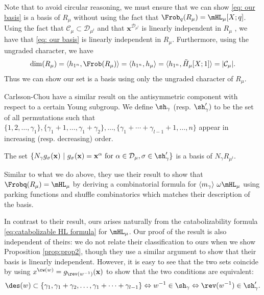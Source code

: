 \begin{rema}
    Note that to avoid circular reasoning, we must ensure that we can show \eqref{eq: our basis} is a basis of $R_\mu$ without using the fact that $\Frob_q(R_\mu) =\mHL_\mu[X;q]$. Using the fact that $\mathcal{C}_\mu\subset \mathcal{D}_{\mu^t}$ and that $\mathbf{x}^{\mathcal{D}_{\mu^t}}$ is linearly independent in $R_\mu$ \cite[Corollary 3.14]{CC}, we have that \eqref{eq: our basis} is linearly independent in $R_\mu$. Furthermore, using the ungraded character, we have
    \[\dim(R_\mu) = \langle h_{1^n}, \Frob(R_\mu)\rangle = \langle h_{1^n}, h_\mu \rangle = \langle h_{1^n}, \tilde{H}_\mu[X;1] \rangle =|\mathcal{C}_\mu|. \]
    Thus we can show our set is a basis using only the ungraded character of $R_\mu$.
\end{rema}

Carlsson-Chou \cite{CC} have a similar result on the antisymmetric component with respect to a certain Young subgroup. 
We define $\sh_\gamma$ (resp. $\sh'_\gamma)$ to be the set of all permutations such that $\{1,2,\dots, \gamma_1\}, \{\gamma_1+1,\dots, \gamma_1+\gamma_2\}, \dots, \{\gamma_1+\cdots + \gamma_{l-1} + 1, \dots, n\}$ appear in increasing (resp. decreasing) order.

\begin{thm}
    The set $\{N_\gamma g_\sigma(\mathbf{x}) \ | \  g_\sigma(\mathbf{x}) = \mathbf{x}^\alpha \text{ for }\alpha\in \mathcal{D}_\mu, \sigma \in \sh'_{\gamma}\}$ is a basis of $N_\gamma R_{\mu^t}$.
\end{thm}
Similar to what we do above, they use their result to show that $\Frobq(R_{\mu}) = \mHL_{\mu}$ by deriving a combinatorial formula for $\langle m_\gamma\rangle  \  \omega \mHL_{\mu}$ using parking functions and shuffle combinatorics which matches their description of the basis.

In contrast to their result, ours arises naturally from the catabolizability formula \eqref{eq:catabolizable HL formula} for $\mHL_{\mu}$. 
Our proof of the result is also independent of theirs: we do not relate their classification to ours when we show Proposition \ref{prop:prop2}, though they use a similar argument to show that their basis is linearly independent. 
However, it is easy to see that the two sets coincide by using $x^{\cw(w)} = g_{\rev(w^{-1})}(\mathbf{x})$ to show that the two conditions are equivalent:
\[\des(w) \subset \{\gamma_1,\gamma_1 + \gamma_2, \dots, \gamma_1 + \cdots + \gamma_{l-1}\} \Leftrightarrow w^{-1} \in \sh_\gamma  \Leftrightarrow \rev(w^{-1}) \in \sh'_\gamma.\]

